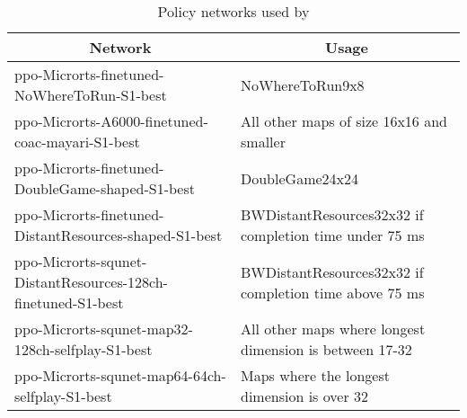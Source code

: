 \documentclass[conference]{IEEEtran}
\begin{document}
\begin{table}[t]
    \caption{Policy networks used by \agentName}
    \label{tab:policy-networks}
    \begin{center}
        \begin{tabular}{p{0.5\linewidth}p{0.5\linewidth}}
            \multicolumn{1}{c}{\bf Network}  &\multicolumn{1}{c}{\bf Usage} \\
            \midrule
            ppo-Microrts-finetuned-NoWhereToRun-S1-best & NoWhereToRun9x8 \\ \hline
            ppo-Microrts-A6000-finetuned-coac-mayari-S1-best & All other maps of size 16x16 and smaller \\ \hline
            ppo-Microrts-finetuned-DoubleGame-shaped-S1-best & DoubleGame24x24 \\ \hline
            ppo-Microrts-finetuned-DistantResources-shaped-S1-best & BWDistantResources32x32 if completion time under 75 ms \\ \hline
            ppo-Microrts-squnet-DistantResources-128ch-finetuned-S1-best & BWDistantResources32x32 if completion time above 75 ms \\ \hline
            ppo-Microrts-squnet-map32-128ch-selfplay-S1-best & All other maps where longest dimension is between 17-32 \\ \hline
            ppo-Microrts-squnet-map64-64ch-selfplay-S1-best & Maps where the longest
            dimension is over 32 \\
        \end{tabular}
    \end{center}
\end{table}

\clearpage
\onecolumn
\end{document}
